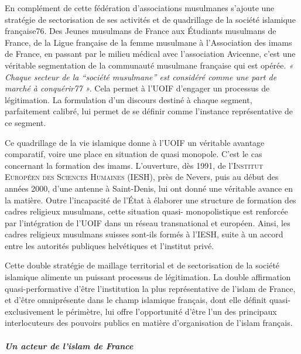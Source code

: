 En complément de cette fédération d'associations musulmanes s'ajoute une
stratégie de sectorisation de ses activités et de quadrillage de la
société islamique française76. Des Jeunes musulmans de France aux
Étudiants musulmans de France, de la Ligue française de la femme
musulmane à l'Association des imams de France, en passant par le milieu
médical avec l'association Avicenne, c'est une véritable segmentation de
la communauté musulmane française qui est opérée. \emph{« Chaque secteur
de la ``société musulmane'' est considéré comme une part de marché à
conquérir77 ».} Cela permet à l'UOIF d'engager un processus de
légitimation. La formulation d'un discours destiné à chaque segment,
parfaitement calibré, lui permet de se définir comme l'instance
représentative de ce segment.

Ce quadrillage de la vie islamique donne à l'UOIF un véritable avantage
comparatif, voire une place en situation de quasi monopole. C'est le cas
concernant la formation des imams. L'ouverture, dès 1991, de l'\textsc{Institut
Européen des Sciences Humaines (IESH)}, près de Nevers, puis au début des
années 2000, d'une antenne à Saint-Denis, lui
ont donné une véritable avance en la matière. Outre l'incapacité de
l'État à élaborer une structure de formation des cadres religieux
musulmans, cette situation quasi- monopolistique est renforcée par
l'intégration de l'UOIF dans un réseau transnational et européen. Ainsi,
les cadres religieux musulmans suisses sont-ils formés à l'IESH, suite à
un accord entre les autorités publiques helvétiques et l'institut
privé.

Cette double stratégie de maillage territorial et de sectorisation de la
société islamique alimente un puissant processus de légitimation. La
double affirmation quasi-performative d'être l'institution la plus
représentative de l'islam de France, et d'être omniprésente dans le
champ islamique français, dont elle définit quasi-exclusivement le
périmètre, lui offre l'opportunité d'être l'un des principaux
interlocuteurs des pouvoirs publics en matière d'organisation de l'islam
français.


\subparagraph{Un acteur de l'islam de
France}



